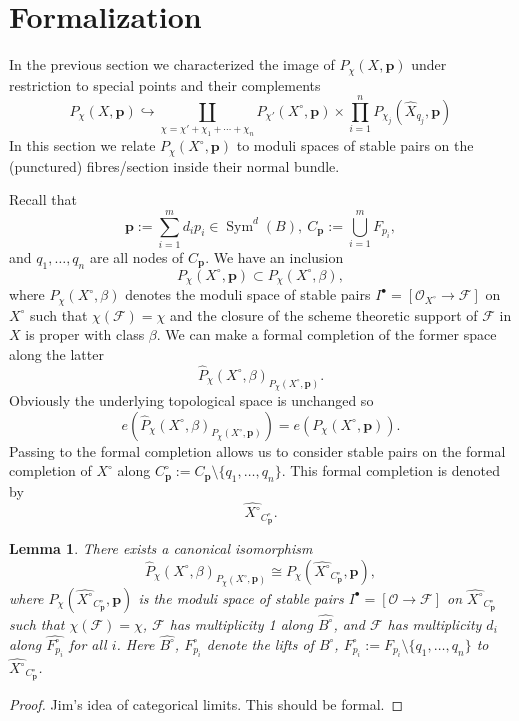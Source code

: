 \documentclass[12pt]{amsart}
\newtheorem{lemma}[theorem]{Lemma}
\theoremstyle{definition}
\theoremstyle{property}
\renewcommand\O{\mathcal O}
\newcommand\mdot{{\scriptscriptstyle\bullet}}
\newcommand\F{\mathcal F}
\newcommand\p{\mathbf{p}}
\renewcommand\_{^{}_}
\newcommand\Sym{\operatorname{Sym}}
\begin{document}
\section{Formalization}

In the previous section we characterized the image of $P_\chi(X,\p)$ under restriction to special points and their complements 
\[
P_\chi(X,\p) \hookrightarrow \coprod_{\chi = \chi' + \chi_1 +  \cdots + \chi_n}  P_{\chi'}(X^{\circ},\p) \times \prod_{i=1}^{n} P_{\chi_j}(\widehat{X}_{q_j},\p)
\]
In this section we relate $P_{\chi}(X^{\circ},\p)$ to moduli spaces of stable pairs on the (punctured) fibres/section inside their normal bundle.

Recall that 
$$
\p := \sum_{i=1}^m d_i p_i \in \Sym^d(B), \ C_{\p} := \bigcup_{i=1}^m F_{p_i}, 
$$ 
and $q_1, \ldots, q_n$ are all nodes of $C_{\p}$. We have an inclusion 
$$
P_{\chi}(X^\circ,\p) \subset P_{\chi}(X^\circ,\beta),
$$
where $P_{\chi}(X^\circ,\beta)$ denotes the moduli space of stable pairs $I^\mdot = [\O_{X^\circ} \rightarrow \F]$ on $X^\circ$ such that $\chi(\F) = \chi$ and the closure of the scheme theoretic support of $\F$ in $X$ is proper with class $\beta$. We can make a formal completion of the former space along the latter
$$
\widehat{P}_{\chi}(X^\circ,\beta)_{P_{\chi}(X^\circ,\p)}.
$$
Obviously the underlying topological space is unchanged so
$$
e(\widehat{P}_{\chi}(X^\circ,\beta)_{P_{\chi}(X^\circ,\p)}) = e(P_{\chi}(X^\circ,\p)).
$$
Passing to the formal completion allows us to consider stable pairs on the formal completion of $X^\circ$ along $C_{\p}^{\circ} := C_{\p} \setminus \{q_1, \ldots, q_n\}$. This formal completion is denoted by
$$
\widehat{X^\circ}_{C_{\p}^{\circ}}.
$$ 
\begin{lemma} \label{lem3}
There exists a canonical isomorphism
\[
\widehat{P}_{\chi}(X^\circ,\beta)_{P_{\chi}(X^\circ,\p)} \cong P_{\chi}(\widehat{X^\circ}_{C_{\p}^{\circ}}, \p),
\]
where $P_{\chi}(\widehat{X^\circ}_{C_{\p}^{\circ}}, \p)$ is the moduli space of stable pairs $I^{\mdot} = [\O \rightarrow \F]$ on $\widehat{X^\circ}_{C_{\p}^{\circ}}$ such that $\chi(\F) = \chi$, $\F$ has multiplicity 1 along $\widehat{B^\circ}$, and $\F$ has multiplicity $d_i$ along $\widehat{F_{p_i}^{\circ}}$ for all $i$. Here $\widehat{B^\circ}$, $\widehat{F_{p_i}^{\circ}}$ denote the lifts of $B^\circ$, $F_{p_i}^{\circ} := F_{p_i} \setminus \{q_1, \ldots, q_n\}$ to $\widehat{X^\circ}_{C_{\p}^{\circ}}$. 
\end{lemma}
\begin{proof}
Jim's idea of categorical limits. This should be formal.
\end{proof}
\end{document}
